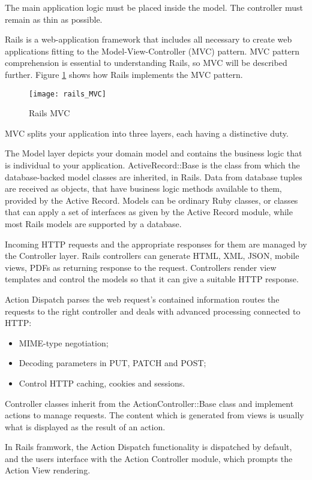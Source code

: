 The main application logic must be placed inside the model. The controller must remain as thin as possible. 

Rails is a web-application framework that includes all necessary to create web applications fitting to the Model-View-Controller (MVC) pattern.
MVC pattern comprehension is essential to understanding Rails, so MVC will be described further. 
Figure \ref{rails_mvc} shows how Rails implements the MVC pattern. 

\begin{figure}[!ht]
\centering
\texttt{[image: rails\_MVC]}
\caption{Rails MVC}\label{rails_mvc}
\end{figure}

MVC splits your application into three layers, each having a distinctive duty.

The Model layer depicts your domain model and contains the business logic that is individual to your application. ActiveRecord::Base is the class from which the database-backed model classes are inherited, in Rails. Data from database tuples are received as objects, that have business logic methods available to them, provided by the Active Record. Models can be ordinary Ruby classes, or classes that can apply a set of interfaces as given by the Active Record module, while most Rails models are supported by a database.

Incoming HTTP requests and the appropriate responses for them are managed by the Controller layer.
Rails controllers can generate HTML, XML, JSON, mobile views, PDFs as returning response to the request. Controllers render view templates and control the models so that it can give a suitable HTTP response. 

Action Dispatch parses the web request's contained information routes the requests to the right controller and deals with advanced processing connected to HTTP:
\begin{itemize}
  \item MIME-type negotiation;
  \item Decoding parameters in PUT, PATCH and POST;
  \item Control HTTP caching, cookies and sessions.
\end{itemize}

Controller classes inherit from the ActionController::Base class and implement actions to manage requests. The content which is generated from views is usually what is displayed as the result of an action. 

In Rails framwork, the Action Dispatch functionality is dispatched by default, and the users interface with the Action Controller module, which prompts the Action View rendering. 

